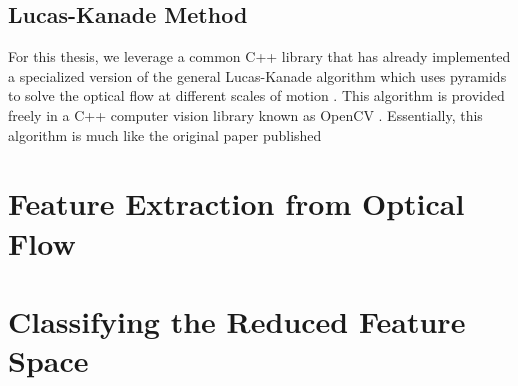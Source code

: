 \subsection{\label{subsection:lucas_kanade} Lucas-Kanade Method}
For this thesis, we leverage a common C++ library that has already implemented
a specialized version of the general Lucas-Kanade algorithm which uses pyramids
to solve the optical flow at different scales of motion
 \cite{bouguet2001pyramidal}. This algorithm is provided freely in a C++ computer
 vision library known as OpenCV \cite{itseez2015opencv}. Essentially, this algorithm is much like the original
 paper published


\section{\label{section:feature_extraction}Feature Extraction from Optical Flow}
\section{\label{section:classification}Classifying the Reduced Feature Space}

